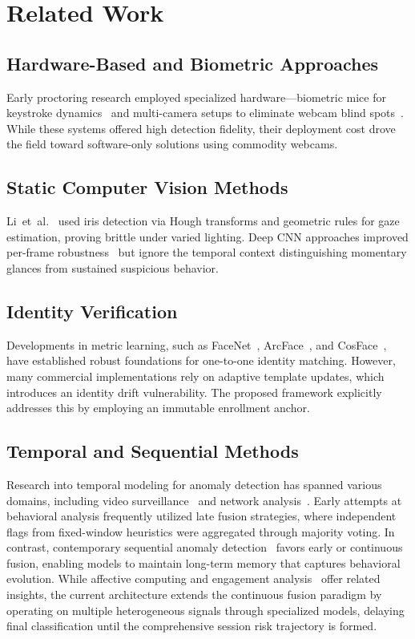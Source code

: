 \documentclass[journal]{IEEEtran}
\begin{document}
\section{Related Work}
\label{sec:related}

\subsection{Hardware-Based and Biometric Approaches}
Early proctoring research employed specialized hardware---biometric mice for keystroke dynamics~\cite{Traore2011} and multi-camera setups to eliminate webcam blind spots~\cite{Atoum2017}. While these systems offered high detection fidelity, their deployment cost drove the field toward software-only solutions using commodity webcams.

\subsection{Static Computer Vision Methods}
Li~et~al.~\cite{Li2018} used iris detection via Hough transforms and geometric rules for gaze estimation, proving brittle under varied lighting. Deep CNN approaches improved per-frame robustness~\cite{Doughty2022, Ghizlane2019} but ignore the temporal context distinguishing momentary glances from sustained suspicious behavior.

\subsection{Identity Verification}
Developments in metric learning, such as FaceNet~\cite{Schroff2015}, ArcFace~\cite{Deng2019}, and CosFace~\cite{Wang2018}, have established robust foundations for one-to-one identity matching. However, many commercial implementations rely on adaptive template updates, which introduces an identity drift vulnerability. The proposed framework explicitly addresses this by employing an immutable enrollment anchor.

\subsection{Temporal and Sequential Methods}
Research into temporal modeling for anomaly detection has spanned various domains, including video surveillance~\cite{Liu2018, Sultani2018} and network analysis~\cite{Mahoney2003}. Early attempts at behavioral analysis frequently utilized late fusion strategies, where independent flags from fixed-window heuristics were aggregated through majority voting. In contrast, contemporary sequential anomaly detection~\cite{Chandola2009} favors early or continuous fusion, enabling models to maintain long-term memory that captures behavioral evolution. While affective computing and engagement analysis~\cite{Dewan2019, Garcia2021} offer related insights, the current architecture extends the continuous fusion paradigm by operating on multiple heterogeneous signals through specialized models, delaying final classification until the comprehensive session risk trajectory is formed.
\end{document}
